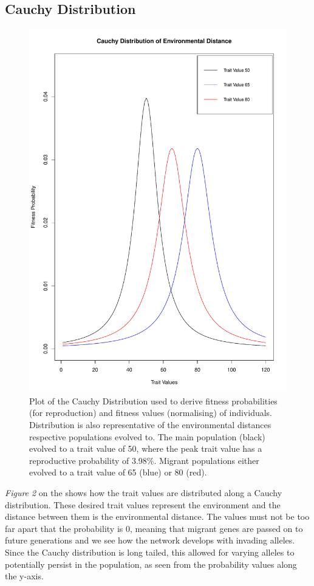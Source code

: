 \subsection{Cauchy Distribution}
\begin{figure}
    \begin{center}
        \includegraphics[scale=0.2]{../Results/Cauchy_Distribution.pdf}
    \end{center}
    \caption{Plot of the Cauchy Distribution used to derive fitness probabilities (for reproduction) and fitness values (normalising) of individuals. Distribution is also representative of the environmental distances respective populations evolved to. The main population (black) evolved to a trait value of 50, where the peak trait value has a reproductive probability of 3.98\%. Migrant populations either evolved to a trait value of 65 (blue) or 80 (red).}
    \label{fig:Cauchy Distribution}
\end{figure}
\textit{Figure 2} on the shows how the trait values are distributed along a Cauchy distribution. These desired trait values represent the environment and the distance between them is the environmental distance. The values must not be too far apart that the probability is 0, meaning that migrant genes are passed on to future generations and we see how the network develops with invading alleles. Since the Cauchy distribution is long tailed, this allowed for varying alleles to potentially persist in the population, as seen from the probability values along the y-axis.
